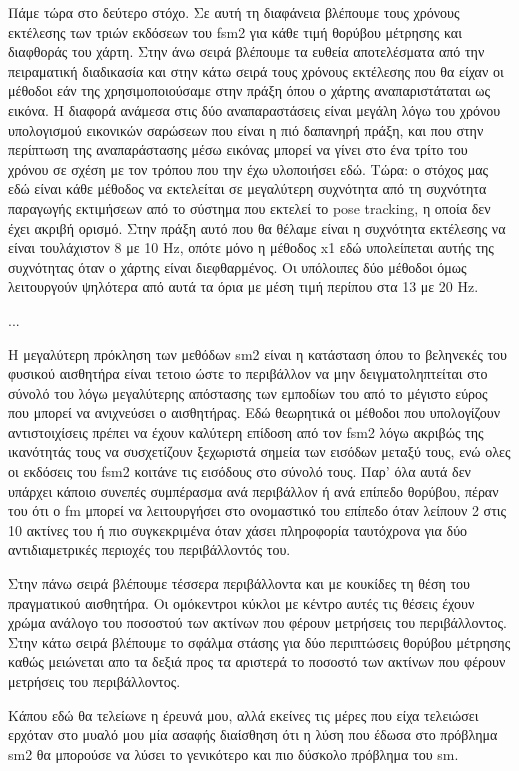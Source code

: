 \documentclass[a4paper,10pt]{article}
\begin{document}
Πάμε τώρα στο δεύτερο στόχο. Σε αυτή τη διαφάνεια βλέπουμε τους χρόνους
εκτέλεσης των τριών εκδόσεων του fsm2 για κάθε τιμή θορύβου μέτρησης και
διαφθοράς του χάρτη. Στην άνω σειρά βλέπουμε τα ευθεία αποτελέσματα από την
πειραματική διαδικασία και στην κάτω σειρά τους χρόνους εκτέλεσης που θα είχαν
οι μέθοδοι εάν της χρησιμοποιούσαμε στην πράξη όπου ο χάρτης αναπαριστάταται ως
εικόνα. Η διαφορά ανάμεσα στις δύο αναπαραστάσεις είναι μεγάλη λόγω του χρόνου
υπολογισμού εικονικών σαρώσεων που είναι η πιό δαπανηρή πράξη, και που στην
περίπτωση της αναπαράστασης μέσω εικόνας μπορεί να γίνει στο ένα τρίτο του
χρόνου σε σχέση με τον τρόπου που την έχω υλοποιήσει εδώ. Τώρα: ο στόχος μας
εδώ είναι κάθε μέθοδος να εκτελείται σε μεγαλύτερη συχνότητα από τη συχνότητα
παραγωγής εκτιμήσεων από το σύστημα που εκτελεί το pose tracking, η οποία δεν
έχει ακριβή ορισμό.  Στην πράξη αυτό που θα θέλαμε είναι η συχνότητα εκτέλεσης
να είναι τουλάχιστον 8 με 10 Hz, οπότε μόνο η μέθοδος x1 εδώ υπολείπεται
αυτής της συχνότητας όταν ο χάρτης είναι διεφθαρμένος. Οι υπόλοιπες δύο μέθοδοι
όμως λειτουργούν ψηλότερα από αυτά τα όρια με μέση τιμή περίπου στα 13 με 20
Hz.

...

Η μεγαλύτερη πρόκληση των μεθόδων sm2 είναι η κατάσταση όπου το βεληνεκές του
φυσικού αισθητήρα είναι τετοιο ώστε το περιβάλλον να μην δειγματοληπτείται στο
σύνολό του λόγω μεγαλύτερης απόστασης των εμποδίων του από το μέγιστο εύρος που
μπορεί να ανιχνεύσει ο αισθητήρας. Εδώ θεωρητικά οι μέθοδοι που υπολογίζουν
αντιστοιχίσεις πρέπει να έχουν καλύτερη επίδοση από τον fsm2 λόγω ακριβώς της
ικανότητάς τους να συσχετίζουν ξεχωριστά σημεία των εισόδων μεταξύ τους, ενώ
ολες οι εκδόσεις του fsm2 κοιτάνε τις εισόδους στο σύνολό τους.  Παρ' όλα αυτά
δεν υπάρχει κάποιο συνεπές συμπέρασμα ανά περιβάλλον ή ανά επίπεδο θορύβου,
πέραν του ότι ο fm μπορεί να λειτουργήσει στο ονομαστικό του επίπεδο όταν
λείπουν 2 στις 10 ακτίνες του ή πιο συγκεκριμένα όταν χάσει πληροφορία
ταυτόχρονα για δύο αντιδιαμετρικές περιοχές του περιβάλλοντός του.

Στην πάνω σειρά βλέπουμε τέσσερα περιβάλλοντα και με κουκίδες τη
θέση του πραγματικού αισθητήρα. Οι ομόκεντροι κύκλοι με κέντρο αυτές τις θέσεις
έχουν χρώμα ανάλογο του ποσοστού των ακτίνων που φέρουν μετρήσεις του
περιβάλλοντος. Στην κάτω σειρά βλέπουμε το σφάλμα στάσης για δύο περιπτώσεις
θορύβου μέτρησης καθώς μειώνεται απο τα δεξιά προς τα αριστερά το ποσοστό των
ακτίνων που φέρουν μετρήσεις του περιβάλλοντος.

Κάπου εδώ θα τελείωνε η έρευνά μου, αλλά εκείνες τις μέρες που είχα τελειώσει
ερχόταν στο μυαλό μου μία ασαφής διαίσθηση ότι η λύση που έδωσα στο πρόβλημα sm2
θα μπορούσε να λύσει το γενικότερο και πιο δύσκολο πρόβλημα του sm.
\end{document}
